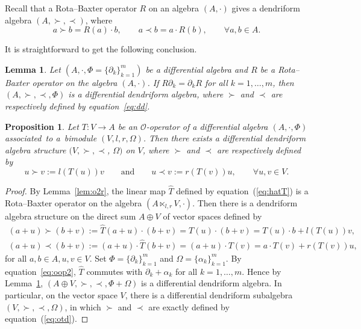 \documentclass[10pt,a4paper]{amsart}
\numberwithin{equation}{section}
\newtheorem{Lemma}[Theorem]{Lemma}
\newtheorem{Proposition}[Theorem]{Proposition}
{ \theoremstyle{definition}
	\newtheorem{Definition}[Theorem]{Definition}
	\newtheorem{Note}[Theorem]{Note}
	\newtheorem{Example}[Theorem]{Example}
	\newtheorem{Remark}[Theorem]{Remark} }
\begin{document}
Recall \cite{aguiar2000pre,bai2013splitting} that a Rota--Baxter operator $R$ on an algebra $(A,\cdot)$ gives a dendriform algebra $(A,\succ,\prec)$, where
\begin{equation}
	a \succ b = R(a) \cdot b, \qquad a\prec b = a\cdot R(b), \qquad \forall a, b \in A. \label{eq:dd}
\end{equation}

It is straightforward to get the following conclusion.
\begin{Lemma}\label{lem:ff}
Let $(A, \cdot, \Phi = \{\partial_k\}_{k=1}^m)$ be a differential
algebra and $R$ be a Rota--Baxter operator on the algebra
$(A,\cdot)$. If $R\partial_k=\partial_kR$ for all $k=1,\dots, m$, then
$(A,\succ,\prec, \Phi)$ is a differential dendriform algebra,
where $\succ$ and $\prec$ are respectively defined by equation~\eqref{eq:dd}.
\end{Lemma}

\begin{Proposition}\label{pro:opd} Let $T\colon V \to A$ be an $\mathcal{O}$-operator of a differential algebra $(A, \cdot, \Phi)$ associated~to a~bimodule $(V, l, r, \Omega)$.
 Then there exists a differential dendriform algebra structure $(V, \succ, \prec$, $\Omega)$ on $V$,
 where $\succ$ and $\prec$ are respectively defined by
 \begin{equation}
 u \succ v := l(T(u)) v \qquad \text{and} \qquad
 u \prec v := r(T(v)) u, \qquad
 \forall u, v \in V. \label{eq:otd}
 \end{equation}
\end{Proposition}
\begin{proof}
	By Lemma~\ref{lem:o2r}, the linear map $\hat T$ defined by equation~(\ref{eq:hatT}) is a Rota--Baxter operator on the algebra $(A \ltimes_{l, r} V, \cdot)$.
	Then there is a dendriform algebra structure on the direct sum $A\oplus V$ of vector spaces defined by
	\begin{gather*}
		(a+u) \succ (b+v) :=\hat T(a+u) \cdot (b+v)=T(u)\cdot (b+v)=T(u)\cdot b+l(T(u)) v, \\
		(a+u) \prec (b+v) := (a+u) \cdot \hat T(b+v)=(a+u)\cdot T(v)=a\cdot T(v)+ r(T(v)) u,
	\end{gather*}
	for all $a, b \in A, u, v \in V$.
	Set $\Phi = \{\partial_k\}_{k=1}^m$ and $\Omega = \{\alpha_k\}_{k=1}^m$.
	By equation~\eqref{eq:oop2}, $\hat T$ commutes with $\partial_k + \alpha_k$ for all $k=1, \dots, m$.
	Hence by Lemma~\ref{lem:ff}, $(A\oplus V, \succ, \prec, \Phi + \Omega)$ is a differential dendriform algebra.
	In particular, on the vector space $V$, there is a differential dendriform subalgebra $(V,\succ,\prec, \Omega)$,
	in which $\succ$ and $\prec$ are exactly defined by equation~(\ref{eq:otd}).
\end{proof}
\end{document}
